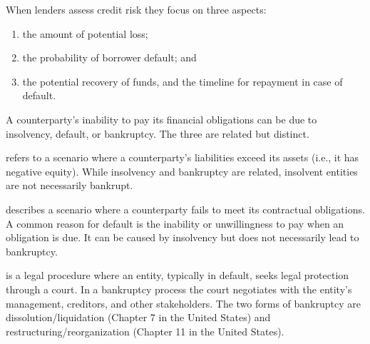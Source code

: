 \begin{crkeybox}
When lenders assess credit risk they focus on three aspects:
\begin{enumerate}[label=\alph*)]
\item the amount of potential loss;
\item the probability of borrower default; and
\item the potential recovery of funds, and the timeline for repayment in case of default.
\end{enumerate}
\end{crkeybox}


A counterparty's inability to pay its financial obligations can be due to
insolvency, default, or bankruptcy. The three are related but distinct.

\begin{crdefbox}
 refers to a scenario where a counterparty's liabilities exceed
its assets (i.e., it has negative equity). While insolvency and bankruptcy are
related, insolvent entities are not necessarily bankrupt.

\smallskip
{} describes a scenario where a counterparty fails to meet its
contractual obligations. A common reason for default is the inability or
unwillingness to pay when an obligation is due. It can be caused by insolvency
but does not necessarily lead to bankruptcy.

\smallskip
{} is a legal procedure where an entity, typically in default,
seeks legal protection through a court. In a bankruptcy process the court
negotiates with the entity's management, creditors, and other stakeholders. The
two forms of bankruptcy are dissolution/liquidation (Chapter 7 in the United
States) and restructuring/reorganization (Chapter 11 in the United States).
\end{crdefbox}


